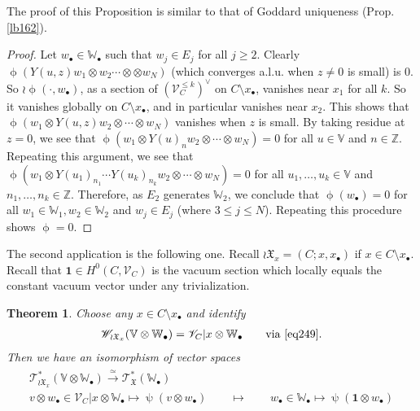 \documentclass[11pt,b5paper,notitlepage]{article}
\theoremstyle{definition}
\theoremstyle{plain}
\newtheorem{thm}[df]{Theorem}
\newcommand{\fk}{\mathfrak}
\newcommand{\id}{\mathbf{1}}
\newcommand{\scr}{\mathscr}
\newcommand{\blt}{\bullet}
\newcommand{\Vbb}{\mathbb V}
\newcommand{\Wbb}{\mathbb W}
\newcommand{\Zbb}{\mathbb Z}
\numberwithin{equation}{section}
\begin{document}
The proof of this Proposition is similar to that of Goddard uniqueness (Prop. \ref{lb162}).

\begin{proof}
Let $w_\blt\in\Wbb_\blt$ such that $w_j\in E_j$ for all $j\geq 2$. Clearly $\upphi(Y(u,z)w_1\otimes w_2\cdots\otimes \otimes w_N)$ (which converges a.l.u. when $z\neq 0$ is small) is $0$. So $\wr\upphi(\cdot,w_\blt)$, as a section of $(\scr V_C^{\leq k})^\vee$ on $C\setminus x_\blt$, vanishes near $x_1$ for all $k$. So it vanishes globally on $C\setminus x_\blt$, and  in particular vanishes near $x_2$. This shows that $\upphi(w_1\otimes Y(u,z)w_2\otimes \cdots\otimes w_N)$ vanishes when $z$ is small. By taking residue at $z=0$, we see that $\upphi(w_1\otimes Y(u)_nw_2\otimes\cdots\otimes w_N)=0$ for all $u\in\Vbb$ and $n\in\Zbb$. Repeating this argument, we see that $\upphi(w_1\otimes Y(u_1)_{n_1}\cdots Y(u_k)_{n_k}w_2\otimes\cdots\otimes w_N)=0$ for all $u_1,\dots,u_k\in\Vbb$ and $n_1,\dots,n_k\in\Zbb$. Therefore, as $E_2$ generates $\Wbb_2$, we conclude that $\upphi(w_\blt)=0$ for all $w_1\in\Wbb_1,w_2\in\Wbb_2$ and $w_j\in E_j$ (where $3\leq j\leq N$). Repeating this procedure shows $\upphi=0$.
\end{proof}




The second application is the following one. Recall $\wr\fk X_x=(C;x,x_\blt)$ if $x\in C\setminus x_\blt$. Recall that $\id\in H^0(C,\scr V_C)$ is the vacuum section which locally equals the constant vacuum vector under any trivialization. 





\begin{thm}\label{lb166}
Choose any $x\in C\setminus x_\blt$ and identify 
\begin{gather*}
\scr W_{\wr\fk X_x}(\Vbb\otimes \Wbb_\blt)=\scr V_C|x\otimes\Wbb_\blt\qquad\text{via }\eqref{eq249}.
\end{gather*}
Then we have an isomorphism of vector spaces
\begin{gather}\label{eq251}
\begin{gathered}
\scr T_{\wr\fk X_x}^*(\Vbb\otimes\Wbb_\blt)\xrightarrow{\simeq}\scr T_{\fk X}^*(\Wbb_\blt)\\
\boxed{v\otimes w_\blt\in\scr V_C|x\otimes\Wbb_\blt\mapsto\uppsi(v\otimes w_\blt)}\qquad\mapsto \qquad \boxed{w_\blt\in \Wbb_\blt\mapsto \uppsi(\id\otimes w_\blt)}  
\end{gathered}
\end{gather}
\end{thm}
\end{document}
